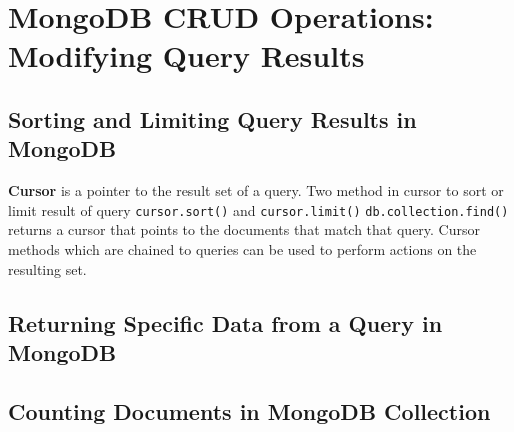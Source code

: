 \documentclass[../main.tex]{subfiles}
\begin{document}
\chapter{MongoDB CRUD Operations: Modifying Query Results}

\section{Sorting and Limiting Query Results in MongoDB}
\textbf{Cursor} is a pointer to the result set of a query.
Two method in cursor to sort or limit result of query \lstinline{cursor.sort()} and \lstinline{cursor.limit()}
\lstinline{db.collection.find()} returns a cursor that points to the documents that match that query.
Cursor methods which are chained to queries can be used to perform actions on the resulting set.
\section{Returning Specific Data from a Query in MongoDB}
\section{Counting Documents in MongoDB Collection}

\printglossaries
\end{document}
